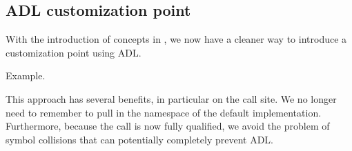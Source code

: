 \subsection{\texorpdfstring{ ADL customization point}{C++20 ADL customization point}}

With the introduction of concepts in , we now have a cleaner way to introduce a customization point using ADL.

\begin{box-note}
\footnotesize Example.
\tcblower
{}
\end{box-note}

This approach has several benefits, in particular on the call site. We no longer need to remember to pull in the namespace of the default implementation. Furthermore, because the call is now fully qualified, we avoid the problem of symbol collisions that can potentially completely prevent ADL.